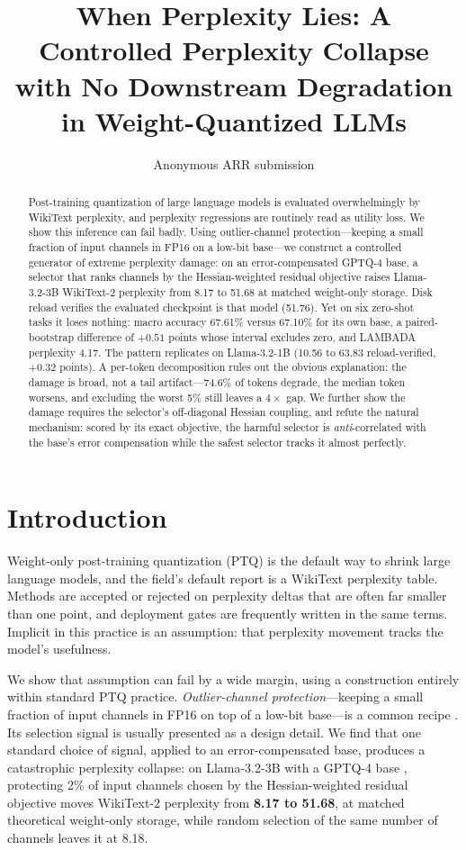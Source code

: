 \documentclass[11pt]{article}
\title{When Perplexity Lies: A Controlled Perplexity Collapse\\
       with No Downstream Degradation in Weight-Quantized LLMs}
\author{Anonymous ARR submission}
\newcommand{\best}[1]{\textbf{#1}}
\begin{document}
\maketitle

\begin{abstract}
Post-training quantization of large language models is evaluated overwhelmingly by WikiText
perplexity, and perplexity regressions are routinely read as utility loss. We show this
inference can fail badly. Using outlier-channel protection---keeping a small fraction of input
channels in FP16 on a low-bit base---we construct a controlled generator of extreme perplexity
damage: on an error-compensated GPTQ-4 base, a selector that ranks channels by the
Hessian-weighted residual objective raises Llama-3.2-3B WikiText-2 perplexity from 8.17 to
51.68 at matched weight-only storage. Disk reload verifies the evaluated checkpoint is that
model (51.76). Yet on six zero-shot tasks it loses nothing: macro accuracy 67.61\% versus
67.10\% for its own base, a paired-bootstrap difference of $+0.51$ points whose interval
excludes zero, and LAMBADA perplexity 4.17. The pattern replicates on Llama-3.2-1B (10.56 to
63.83 reload-verified, $+0.32$ points). A per-token decomposition rules out the obvious
explanation: the damage is broad, not a tail artifact---74.6\% of tokens degrade, the median
token worsens, and excluding the worst 5\% still leaves a $4\times$ gap. We further show the
damage requires the selector's off-diagonal Hessian coupling, and refute the natural mechanism:
scored by its exact objective, the harmful selector is \emph{anti}-correlated with the base's
error compensation while the safest selector tracks it almost perfectly.
\end{abstract}

\section{Introduction}
\label{sec:intro}

Weight-only post-training quantization (PTQ) is the default way to shrink large language
models, and the field's default report is a WikiText perplexity table. Methods are accepted or
rejected on perplexity deltas that are often far smaller than one point, and deployment gates
are frequently written in the same terms. Implicit in this practice is an assumption: that
perplexity movement tracks the model's usefulness.

We show that assumption can fail by a wide margin, using a construction entirely within
standard PTQ practice. \emph{Outlier-channel protection}---keeping a small fraction of input
channels in FP16 on top of a low-bit base---is a common recipe
\citep{dettmers2022llmint8,lee2024owq,dettmers2023spqr}. Its selection signal is usually
presented as a design detail. We find that one standard choice of signal, applied to an
error-compensated base, produces a catastrophic perplexity collapse: on Llama-3.2-3B with a
GPTQ-4 base \citep{frantar2023gptq}, protecting 2\% of input channels chosen by the
Hessian-weighted residual objective moves WikiText-2 perplexity from \best{8.17 to 51.68}, at
matched theoretical weight-only storage, while random selection of the same number of channels
leaves it at 8.18.
\end{document}
